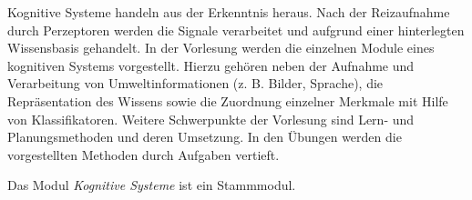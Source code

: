 \begin{module}
\begin{content}
Kognitive Systeme handeln aus der Erkenntnis heraus. Nach der Reizaufnahme durch Perzeptoren werden die Signale verarbeitet und aufgrund einer hinterlegten Wissensbasis gehandelt. In der Vorlesung werden die einzelnen Module eines kognitiven Systems vorgestellt. Hierzu gehören neben der Aufnahme und Verarbeitung von Umweltinformationen (z. B. Bilder, Sprache), die Repräsentation des Wissens sowie die Zuordnung einzelner Merkmale mit Hilfe von Klassifikatoren. Weitere Schwerpunkte der Vorlesung sind Lern- und Planungsmethoden und deren Umsetzung. In den Übungen werden die vorgestellten Methoden durch Aufgaben vertieft.


\end{content}

\begin{remarks}Das Modul \emph{Kognitive Systeme} ist ein Stammmodul.

\end{remarks}

\end{module}


